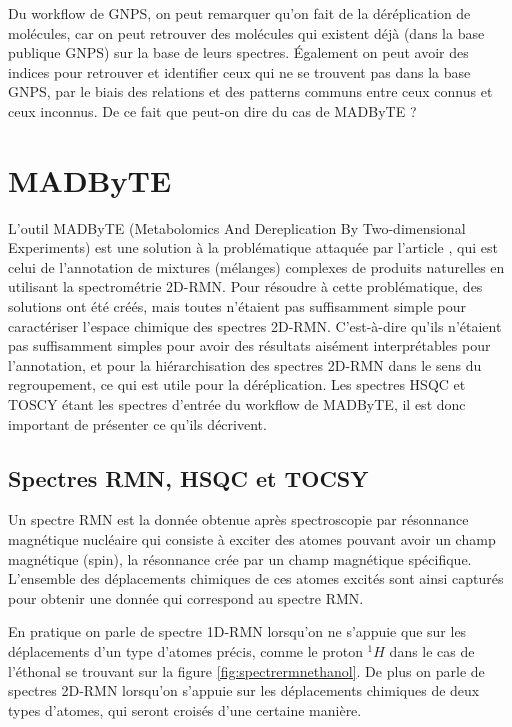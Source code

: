 \documentclass[12pt, french, latin.medieval, a4paper]{report}
\begin{document}
            Du workflow de GNPS, on peut remarquer qu’on fait de la déréplication de molécules, car on peut retrouver des molécules qui existent déjà (dans la base publique GNPS) sur la base de leurs spectres. Également on peut avoir des indices pour retrouver et identifier ceux qui ne se trouvent pas dans la base GNPS, par le biais des relations et des patterns communs entre ceux connus et ceux inconnus. De ce fait que peut-on dire du cas de MADByTE ?
            
    \section{MADByTE}
        L'outil MADByTE (Metabolomics And Dereplication By Two-dimensional Experiments) est une solution à la problématique attaquée par l'article \cite{egan2021development}, qui est celui de l’annotation de mixtures (mélanges) complexes de produits naturelles en utilisant la spectrométrie 2D-RMN. Pour résoudre à cette problématique, des solutions ont été créés, mais toutes n'étaient pas suffisamment simple pour caractériser l'espace chimique des spectres 2D-RMN. C’est-à-dire qu’ils n'étaient pas suffisamment simples pour avoir des résultats aisément interprétables pour l'annotation, et pour la hiérarchisation des spectres 2D-RMN dans le sens du regroupement, ce qui est utile pour la déréplication. Les spectres HSQC et TOSCY étant les spectres d’entrée du workflow de MADByTE, il est donc important de présenter ce qu’ils décrivent.

        \subsection{Spectres RMN, HSQC et TOCSY}
            Un spectre RMN est la donnée obtenue après spectroscopie par résonnance magnétique nucléaire qui consiste à exciter des atomes pouvant avoir un champ magnétique (spin), la résonnance crée par un champ magnétique spécifique. L’ensemble des déplacements chimiques de ces atomes excités sont ainsi capturés pour obtenir une donnée qui correspond au spectre RMN.
            
            En pratique on parle de spectre 1D-RMN  lorsqu’on ne s’appuie que sur les déplacements d’un type d’atomes précis, comme le proton $^{1}H$ dans le cas de l'éthonal se trouvant sur la figure \ref{fig:spectrermnethanol}. De plus on parle de spectres 2D-RMN lorsqu’on s’appuie sur les déplacements chimiques de deux types d’atomes, qui seront croisés d’une certaine manière. 
\end{document}
